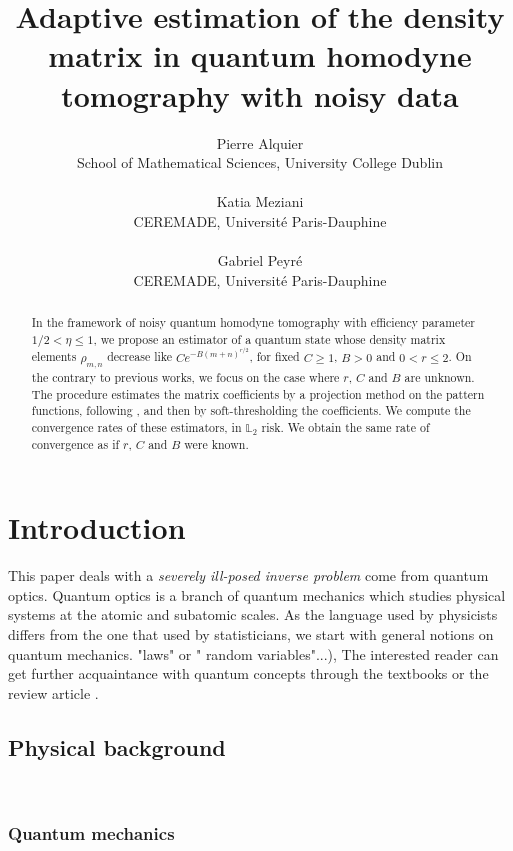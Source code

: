 \documentclass[a4paper]{amsart}
\title[Adaptive estimation of density matrix in QHT]{Adaptive estimation of the
density matrix in quantum homodyne tomography with noisy data}
\author[P. Alquier \& K.Meziani \& G.Peyr\'e]{Pierre Alquier
\\
{\tiny School of Mathematical Sciences, University College Dublin}
\\ \\
Katia Meziani
\\
{\tiny CEREMADE, Universit\'e Paris-Dauphine}
\\ \\
Gabriel Peyr\'e
\\
{\tiny CEREMADE, Universit\'e Paris-Dauphine}
}
\date{}
\begin{document}
\begin{abstract}
    In the framework of noisy quantum homodyne tomography with
    efficiency parameter $1/2 < \eta \leq 1$, we propose an estimator
    of a quantum state whose density matrix elements $\rho_{m,n}$
    decrease like $Ce^{-B(m+n)^{ r/ 2}}$, for fixed $C\geq 1$, $B>0$ and
    $0<r\leq 2$. On the contrary to previous works, we focus on the
    case where $r$, $C$ and $B$ are unknown. The procedure estimates
    the matrix coefficients by a projection method on the pattern functions,
    following \cite{ABM}, and then by soft-thresholding the coefficients. We
    compute the convergence rates of these estimators, in $\mathbb{L}_2$ risk.
    We obtain the same rate of convergence as if $r$, $C$ and $B$ were known.
\end{abstract}

\maketitle

\tableofcontents


\section{Introduction}


This paper deals with a \textit{severely ill-posed inverse problem}  come from
quantum optics. 
Quantum optics is a branch of quantum mechanics which studies  physical systems
at the atomic and subatomic scales. As the language used by physicists differs
from the one that used by statisticians, we start with general notions on
quantum mechanics. %
"laws" or " random variables"...),
The interested reader can get further acquaintance with quantum  concepts
through the
textbooks  or the review article
\cite{Helstrom,Holevo,Barndorff-Nielsen&Gill&Jupp,Leonhardt}. 



\subsection{Physical background}
\label{physbackground}
\noindent\\


\subsubsection{Quantum mechanics}
\label{Quantum mechanics}
\noindent\\
\end{document}
